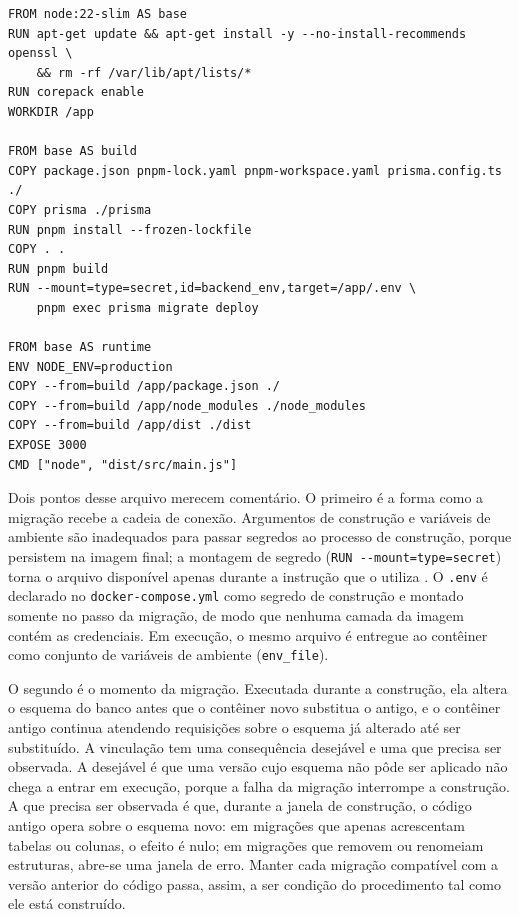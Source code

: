 \FloatBarrier
\begin{quadro}[h!]
\caption{\texttt{Dockerfile} da API}
\label{quad:dockerfile}
\centering
\begin{lstlisting}
FROM node:22-slim AS base
RUN apt-get update && apt-get install -y --no-install-recommends openssl \
    && rm -rf /var/lib/apt/lists/*
RUN corepack enable
WORKDIR /app

FROM base AS build
COPY package.json pnpm-lock.yaml pnpm-workspace.yaml prisma.config.ts ./
COPY prisma ./prisma
RUN pnpm install --frozen-lockfile
COPY . .
RUN pnpm build
RUN --mount=type=secret,id=backend_env,target=/app/.env \
    pnpm exec prisma migrate deploy

FROM base AS runtime
ENV NODE_ENV=production
COPY --from=build /app/package.json ./
COPY --from=build /app/node_modules ./node_modules
COPY --from=build /app/dist ./dist
EXPOSE 3000
CMD ["node", "dist/src/main.js"]
\end{lstlisting}
\end{quadro}
\FloatBarrier

Dois pontos desse arquivo merecem comentário. O primeiro é a forma como a migração recebe a cadeia de conexão. Argumentos de construção e variáveis de ambiente são inadequados para passar segredos ao processo de construção, porque persistem na imagem final; a montagem de segredo (\texttt{RUN -{}-mount=type=secret}) torna o arquivo disponível apenas durante a instrução que o utiliza \cite{docker2026secrets}. O \texttt{.env} é declarado no \texttt{docker-compose.yml} como segredo de construção e montado somente no passo da migração, de modo que nenhuma camada da imagem contém as credenciais. Em execução, o mesmo arquivo é entregue ao contêiner como conjunto de variáveis de ambiente (\texttt{env\_file}).

O segundo é o momento da migração. Executada durante a construção, ela altera o esquema do banco antes que o contêiner novo substitua o antigo, e o contêiner antigo continua atendendo requisições sobre o esquema já alterado até ser substituído. A vinculação tem uma consequência desejável e uma que precisa ser observada. A desejável é que uma versão cujo esquema não pôde ser aplicado não chega a entrar em execução, porque a falha da migração interrompe a construção. A que precisa ser observada é que, durante a janela de construção, o código antigo opera sobre o esquema novo: em migrações que apenas acrescentam tabelas ou colunas, o efeito é nulo; em migrações que removem ou renomeiam estruturas, abre-se uma janela de erro. Manter cada migração compatível com a versão anterior do código passa, assim, a ser condição do procedimento tal como ele está construído.

